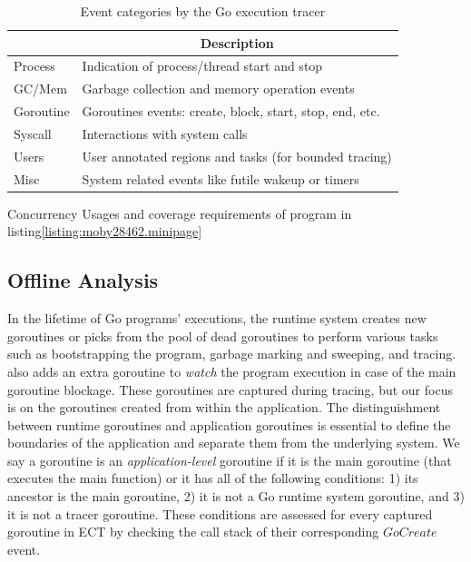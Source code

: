 \begin{table}[]
    \centering
        \caption{Event categories by the Go execution tracer}
        \begin{tabular}{|l|l|}
        \hline
        \rowcolor[HTML]{C0C0C0}
        \multicolumn{1}{|c|}{\cellcolor[HTML]{C0C0C0}\textbf{Category}} & \multicolumn{1}{c|}{\cellcolor[HTML]{C0C0C0}\textbf{Description}} \\ \hline
        Process & Indication of process/thread start and stop \\ \hline
        GC/Mem & Garbage collection and memory operation events\\ \hline
        Goroutine & Goroutines events: create, block, start, stop, end, etc. \\ \hline
        Syscall & Interactions with system calls \\ \hline
        Users & User annotated regions and tasks (for bounded tracing) \\ \hline
        Misc & System related events like futile wakeup or timers \\ \hline
        \end{tabular}
    \label{tab:events}
\end{table}


\begin{table}[]
\centering
\caption{Concurrency Usages and coverage requirements of program in listing\ref{listing:moby28462.minipage}}
\scalebox{0.82}{

}
\label{tab:moby_cov_table}
\end{table}

\subsection{Offline Analysis}
\label{sec:offline_analysis}
In the lifetime of Go programs' executions, the runtime system creates new goroutines or picks from the pool of dead goroutines to perform various tasks such as bootstrapping the program, garbage marking and sweeping, and tracing.
%
\goat also adds an extra goroutine to \textit{watch} the program execution in case of the main goroutine blockage.
%
These goroutines are captured during tracing, but our focus is on the goroutines created from within the application.
%
The distinguishment between runtime goroutines and application goroutines is essential to define the boundaries of the application and separate them from the underlying system.
%
We say a goroutine is an \textit{application-level} goroutine if it is the main goroutine (that executes the main function) or it has all of the following conditions:
1) its ancestor is the main goroutine,
2) it is not a Go runtime system goroutine, and
3) it is not a tracer goroutine.
These conditions are assessed for every captured goroutine in ECT by checking the call stack of their corresponding $GoCreate$ event.

